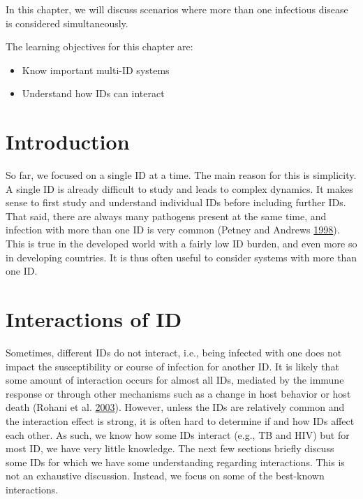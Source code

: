 \documentclass[
]{book}
\providecommand{\tightlist}{%
  \setlength{\itemsep}{0pt}\setlength{\parskip}{0pt}}
\begin{document}
In this chapter, we will discuss scenarios where more than one infectious disease is considered simultaneously.

The learning objectives for this chapter are:

\begin{itemize}
\tightlist
\item
  Know important multi-ID systems
\item
  Understand how IDs can interact
\end{itemize}

\hypertarget{introduction-11}{%
\section{Introduction}\label{introduction-11}}

So far, we focused on a single ID at a time. The main reason for this is simplicity. A single ID is already difficult to study and leads to complex dynamics. It makes sense to first study and understand individual IDs before including further IDs. That said, there are always many pathogens present at the same time, and infection with more than one ID is very common (Petney and Andrews \protect\hyperlink{ref-petney98}{1998}). This is true in the developed world with a fairly low ID burden, and even more so in developing countries. It is thus often useful to consider systems with more than one ID.

\hypertarget{interactions-of-id}{%
\section{Interactions of ID}\label{interactions-of-id}}

Sometimes, different IDs do not interact, i.e., being infected with one does not impact the susceptibility or course of infection for another ID. It is likely that some amount of interaction occurs for almost all IDs, mediated by the immune response or through other mechanisms such as a change in host behavior or host death (Rohani et al. \protect\hyperlink{ref-rohani03}{2003}). However, unless the IDs are relatively common and the interaction effect is strong, it is often hard to determine if and how IDs affect each other. As such, we know how some IDs interact (e.g., TB and HIV) but for most ID, we have very little knowledge. The next few sections briefly discuss some IDs for which we have some understanding regarding interactions. This is not an exhaustive discussion. Instead, we focus on some of the best-known interactions.
\end{document}
